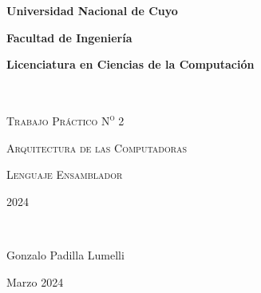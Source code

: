 {\centering
    {\bfseries\Large Universidad Nacional de Cuyo \par}
    \vspace{-0.2cm}
    {\bfseries\Large Facultad de Ingeniería \par}
    \vspace{-0.2cm}
    {\bfseries\Large Licenciatura en Ciencias de la Computación \par}
    \pagestyle{plain}
    \vfill
    \noindent\hrulefill \\
    {\scshape\Huge Trabajo Práctico N\textsuperscript{\Large o} 2\par} %
    \vspace{0.5cm}
    {\scshape\Large Arquitectura de las Computadoras \par}
    {\scshape\Large Lenguaje Ensamblador \par}
    {\scshape\large  \par}
    \vspace{0.5cm}
    {\scshape\Large 2024 \par} %
    \noindent\hrulefill \\
    \vspace{4cm}
    {\Large Gonzalo Padilla Lumelli \par}
    {\large Marzo 2024 \par} %
    \vfill
    \setcounter{page}{1}
    \newpage
}